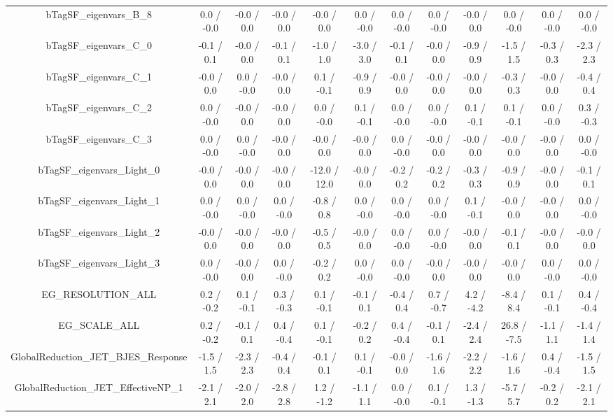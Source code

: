 \begin{table}[htbp]
\begin{center}
\begin{tabular}{|c|c|c|c|c|c|c|c|c|c|c|c|}
  bTagSF_eigenvars_B_8 & 0.0 / -0.0 & -0.0 / 0.0 & -0.0 / 0.0 & -0.0 / 0.0 & 0.0 / -0.0 & 0.0 / -0.0 & 0.0 / -0.0 & -0.0 / 0.0 & 0.0 / -0.0 & 0.0 / -0.0 & 0.0 / -0.0 \\ 
  bTagSF_eigenvars_C_0 & -0.1 / 0.1 & -0.0 / 0.0 & -0.1 / 0.1 & -1.0 / 1.0 & -3.0 / 3.0 & -0.1 / 0.1 & -0.0 / 0.0 & -0.9 / 0.9 & -1.5 / 1.5 & -0.3 / 0.3 & -2.3 / 2.3 \\ 
  bTagSF_eigenvars_C_1 & -0.0 / 0.0 & 0.0 / -0.0 & -0.0 / 0.0 & 0.1 / -0.1 & -0.9 / 0.9 & -0.0 / 0.0 & -0.0 / 0.0 & -0.0 / 0.0 & -0.3 / 0.3 & -0.0 / 0.0 & -0.4 / 0.4 \\ 
  bTagSF_eigenvars_C_2 & 0.0 / -0.0 & -0.0 / 0.0 & -0.0 / 0.0 & 0.0 / -0.0 & 0.1 / -0.1 & 0.0 / -0.0 & 0.0 / -0.0 & 0.1 / -0.1 & 0.1 / -0.1 & 0.0 / -0.0 & 0.3 / -0.3 \\ 
  bTagSF_eigenvars_C_3 & 0.0 / -0.0 & 0.0 / -0.0 & -0.0 / 0.0 & -0.0 / 0.0 & -0.0 / 0.0 & 0.0 / -0.0 & -0.0 / 0.0 & -0.0 / 0.0 & -0.0 / 0.0 & -0.0 / 0.0 & 0.0 / -0.0 \\ 
  bTagSF_eigenvars_Light_0 & -0.0 / 0.0 & -0.0 / 0.0 & -0.0 / 0.0 & -12.0 / 12.0 & -0.0 / 0.0 & -0.2 / 0.2 & -0.2 / 0.2 & -0.3 / 0.3 & -0.9 / 0.9 & -0.0 / 0.0 & -0.1 / 0.1 \\ 
  bTagSF_eigenvars_Light_1 & 0.0 / -0.0 & 0.0 / -0.0 & 0.0 / -0.0 & -0.8 / 0.8 & 0.0 / -0.0 & 0.0 / -0.0 & 0.0 / -0.0 & 0.1 / -0.1 & -0.0 / 0.0 & -0.0 / 0.0 & 0.0 / -0.0 \\ 
  bTagSF_eigenvars_Light_2 & -0.0 / 0.0 & -0.0 / 0.0 & -0.0 / 0.0 & -0.5 / 0.5 & -0.0 / 0.0 & 0.0 / -0.0 & 0.0 / -0.0 & -0.0 / 0.0 & -0.1 / 0.1 & -0.0 / 0.0 & -0.0 / 0.0 \\ 
  bTagSF_eigenvars_Light_3 & 0.0 / -0.0 & -0.0 / 0.0 & 0.0 / -0.0 & -0.2 / 0.2 & 0.0 / -0.0 & 0.0 / -0.0 & -0.0 / 0.0 & -0.0 / 0.0 & -0.0 / 0.0 & 0.0 / -0.0 & 0.0 / -0.0 \\ 
  EG_RESOLUTION_ALL & 0.2 / -0.2 & 0.1 / -0.1 & 0.3 / -0.3 & 0.1 / -0.1 & -0.1 / 0.1 & -0.4 / 0.4 & 0.7 / -0.7 & 4.2 / -4.2 & -8.4 / 8.4 & 0.1 / -0.1 & 0.4 / -0.4 \\ 
  EG_SCALE_ALL & 0.2 / -0.2 & -0.1 / 0.1 & 0.4 / -0.4 & 0.1 / -0.1 & -0.2 / 0.2 & 0.4 / -0.4 & -0.1 / 0.1 & -2.4 / 2.4 & 26.8 / -7.5 & -1.1 / 1.1 & -1.4 / 1.4 \\ 
  GlobalReduction_JET_BJES_Response & -1.5 / 1.5 & -2.3 / 2.3 & -0.4 / 0.4 & -0.1 / 0.1 & 0.1 / -0.1 & -0.0 / 0.0 & -1.6 / 1.6 & -2.2 / 2.2 & -1.6 / 1.6 & 0.4 / -0.4 & -1.5 / 1.5 \\ 
  GlobalReduction_JET_EffectiveNP_1 & -2.1 / 2.1 & -2.0 / 2.0 & -2.8 / 2.8 & 1.2 / -1.2 & -1.1 / 1.1 & 0.0 / -0.0 & 0.1 / -0.1 & 1.3 / -1.3 & -5.7 / 5.7 & -0.2 / 0.2 & -2.1 / 2.1 \\ 

\end{tabular}
\end{center}
\end{table}

